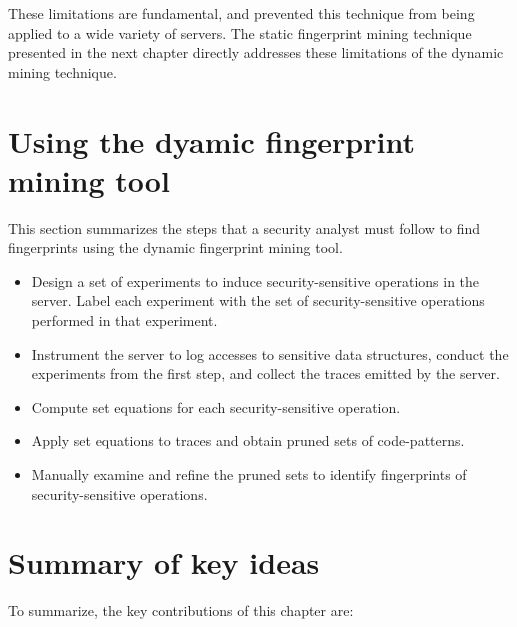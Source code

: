 These limitations are fundamental, and prevented this technique from being
applied to a wide variety of servers. The static fingerprint mining technique
presented in the next chapter directly addresses these limitations of the
dynamic mining technique.


\section{Using the dyamic fingerprint mining tool}
\label{chapter:dynamic:usage}

This section summarizes the steps that a security analyst must follow 
to find fingerprints using the dynamic fingerprint mining tool.

\begin{itemize}

\item Design a set of experiments to induce security-sensitive operations
in the server. Label each experiment with the set of security-sensitive
operations performed in that experiment.

\item Instrument the server to log accesses to sensitive data structures, 
conduct the experiments from the first step, and collect the traces emitted
by the server.

\item Compute set equations for each security-sensitive operation.

\item Apply set equations to traces and obtain pruned sets of code-patterns.

\item Manually examine and refine the pruned sets to identify fingerprints
of security-sensitive operations.

\end{itemize}


\section{Summary of key ideas}
\label{chapter:dynamic:keyideas}

To summarize, the key contributions of this chapter are:

